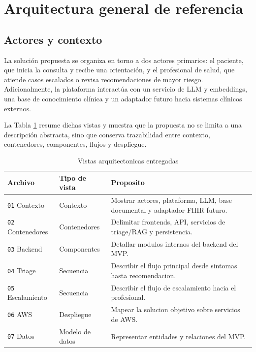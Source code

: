 \documentclass[12pt]{article}
\begin{document}
\section{Arquitectura general de referencia}

\subsection{Actores y contexto}

La solución propuesta se organiza en torno a dos actores primarios: el paciente, que inicia la consulta y recibe una orientación, y el profesional de salud, que atiende casos escalados o revisa recomendaciones de mayor riesgo. Adicionalmente, la plataforma interactúa con un servicio de LLM y embeddings, una base de conocimiento clínica y un adaptador futuro hacia sistemas clínicos externos.

La Tabla \ref{tab:views} resume dichas vistas y muestra que la propuesta no se limita a una descripción abstracta, sino que conserva trazabilidad entre contexto, contenedores, componentes, flujos y despliegue.

\begin{table}[ht]
\caption{Vistas arquitectonicas entregadas}
\label{tab:views}
\centering
\small
\begin{tabularx}{\textwidth}{>{\raggedright\arraybackslash}p{3.2cm} >{\raggedright\arraybackslash}p{3.5cm} X}
\toprule
\textbf{Archivo} & \textbf{Tipo de vista} & \textbf{Proposito} \\
\midrule
\texttt{01} Contexto & Contexto & Mostrar actores, plataforma, LLM, base documental y adaptador FHIR futuro. \\
\texttt{02} Contenedores & Contenedores & Delimitar frontends, API, servicios de triage/RAG y persistencia. \\
\texttt{03} Backend & Componentes & Detallar modulos internos del backend del MVP. \\
\texttt{04} Triage & Secuencia & Describir el flujo principal desde sintomas hasta recomendacion. \\
\texttt{05} Escalamiento & Secuencia & Describir el flujo de escalamiento hacia el profesional. \\
\texttt{06} AWS & Despliegue & Mapear la solucion objetivo sobre servicios de AWS. \\
\texttt{07} Datos & Modelo de datos & Representar entidades y relaciones del MVP. \\
\bottomrule
\end{tabularx}
\end{table}
\end{document}
